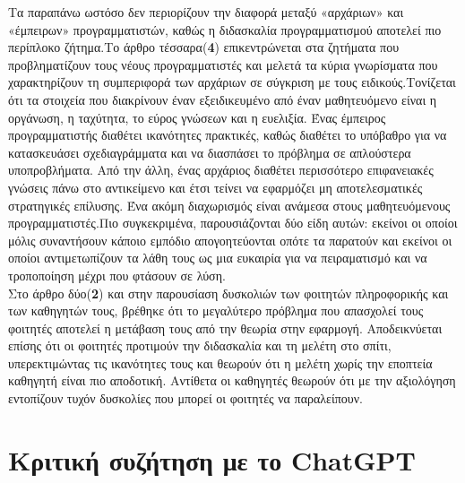 \documentclass{report}
\begin{document}
Τα παραπάνω ωστόσο δεν περιορίζουν την διαφορά μεταξύ «αρχάριων» και «έμπειρων» προγραμματιστών, καθώς η διδασκαλία προγραμματισμού αποτελεί πιο περίπλοκο ζήτημα.Το άρθρο τέσσαρα(\textbf{4}) επικεντρώνεται στα ζητήματα που προβληματίζουν τους νέους προγραμματιστές και μελετά τα κύρια γνωρίσματα που χαρακτηρίζουν τη συμπεριφορά των αρχάριων σε σύγκριση με τους ειδικούς.Τονίζεται ότι τα στοιχεία που διακρίνουν έναν εξειδικευμένο από έναν μαθητευόμενο είναι η οργάνωση, η ταχύτητα, το εύρος γνώσεων και η ευελιξία. Ένας έμπειρος προγραμματιστής διαθέτει ικανότητες πρακτικές, καθώς διαθέτει το υπόβαθρο για να κατασκευάσει σχεδιαγράμματα και να διασπάσει το πρόβλημα σε απλούστερα υποπροβλήματα. Από την άλλη, ένας αρχάριος διαθέτει περισσότερο επιφανειακές γνώσεις πάνω στο αντικείμενο και έτσι τείνει να εφαρμόζει μη αποτελεσματικές στρατηγικές επίλυσης. Ένα ακόμη διαχωρισμός είναι ανάμεσα στους μαθητευόμενους προγραμματιστές.Πιο συγκεκριμένα, παρουσιάζονται δύο είδη αυτών: εκείνοι οι οποίοι μόλις συναντήσουν κάποιο εμπόδιο απογοητεύονται οπότε τα παρατούν και εκείνοι οι οποίοι αντιμετωπίζουν τα λάθη τους ως μια ευκαιρία για να πειραματισμό και να τροποποίηση μέχρι που φτάσουν σε λύση.\\ Στο άρθρο δύο(\textbf{2}) και στην παρουσίαση δυσκολιών των φοιτητών πληροφορικής και των καθηγητών τους, βρέθηκε ότι το μεγαλύτερο πρόβλημα που απασχολεί τους φοιτητές αποτελεί η μετάβαση τους από την θεωρία στην εφαρμογή. Αποδεικνύεται επίσης ότι οι φοιτητές προτιμούν την διδασκαλία και τη μελέτη στο σπίτι, υπερεκτιμώντας τις ικανότητες τους και θεωρούν ότι η μελέτη χωρίς την εποπτεία καθηγητή είναι πιο αποδοτική. Αντίθετα οι καθηγητές θεωρούν ότι με την αξιολόγηση εντοπίζουν τυχόν δυσκολίες που μπορεί οι φοιτητές να παραλείπουν. 

\section{\textbf{Κριτική συζήτηση με το} ChatGPT}
\end{document}
